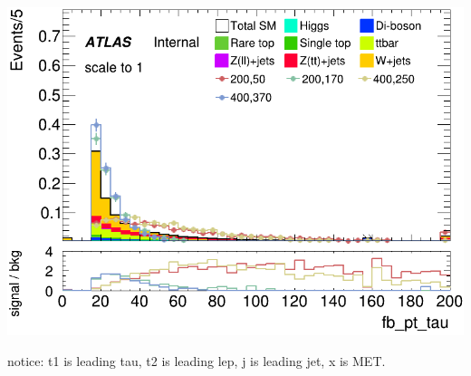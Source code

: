 \documentclass[usenames,dvipsnames]{beamer}
\begin{document}
\begin{frame}
    \hfill
    \begin{minipage}{0.32\textwidth}
        \centering
        \includegraphics[width=\textwidth]{graphics/LH_met_sig/LH_fb_pt_tau_norm.png}
    \end{minipage}
    
    \vspace{0.5cm} %
    
    notice: t1 is leading tau, t2 is leading lep, j is leading jet, x is MET.
\end{frame}
\end{document}
